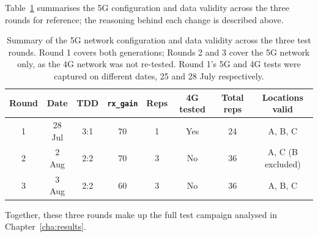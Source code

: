 Table~\ref{tab:test-rounds-summary} summarises the 5G configuration and data validity across the three rounds for reference; the reasoning behind each change is described above.

\begin{table}[htbp]
    \centering
    \begin{tabular}{|c|c|c|c|c|c|c|c|}
        \hline
        \textbf{Round} & \textbf{Date} & \textbf{TDD} & \textbf{\texttt{rx\_gain}} & \textbf{Reps} & \textbf{4G tested} & \textbf{Total reps} & \textbf{Locations valid} \\
        \hline
        1 & 28 Jul & 3:1 & 70 & 1 & Yes & 24 & A, B, C \\
        \hline
        2 & 2 Aug & 2:2 & 70 & 3 & No & 36 & A, C (B excluded) \\
        \hline
        3 & 3 Aug & 2:2 & 60 & 3 & No & 36 & A, B, C \\
        \hline
    \end{tabular}
    \caption{Summary of the 5G network configuration and data validity across the three test rounds. Round 1 covers both generations; Rounds 2 and 3 cover the 5G network only, as the 4G network was not re-tested. Round 1's 5G and 4G tests were captured on different dates, 25 and 28 July respectively.}
    \label{tab:test-rounds-summary}
\end{table}

Together, these three rounds make up the full test campaign analysed in Chapter~\ref{cha:results}. 
